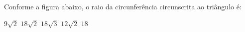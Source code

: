 Conforme a figura abaixo, o raio da circunfer\^encia circunscrita ao tri\^angulo \'e:

\parbox{0.3\linewidth}{

$9\sqrt{2}$
$18\sqrt{2}$
$18\sqrt{3}$
$12\sqrt{2}$
$18$

}\parbox{0.69\linewidth}{
\begin{center}
\vspace{-6mm}
\vspace{-6mm}
\end{center}
}


